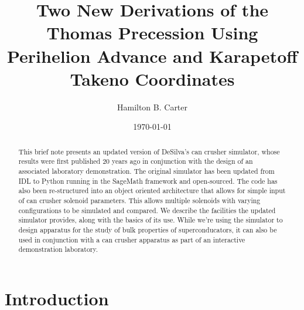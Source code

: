 \documentclass[prb,preprint]{revtex4-1}
\begin{document}

\title{Two New Derivations of the Thomas Precession Using Perihelion Advance and Karapetoff Takeno Coordinates
}

\author{Hamilton B. Carter}



\date{\today}

\begin{abstract}
This brief note  presents an updated version of DeSilva's can crusher simulator, whose results were first published 20 years ago in conjunction with the design of an associated laboratory demonstration.  The original simulator has been updated from IDL to Python running in the SageMath framework and open-sourced.  The code has also been re-structured into an object oriented architecture that allows for simple input of can crusher solenoid parameters.  This allows multiple solenoids with varying configurations to be simulated and compared.  We describe the facilities the updated simulator provides, along with the basics of its use.  While we're using the simulator to design apparatus for the study of bulk properties of superconducators, it can also be used in conjunction with a can crusher apparatus as part of an interactive demonstration laboratory.
\end{abstract}

\maketitle %


\section{Introduction} %
\end{document}
